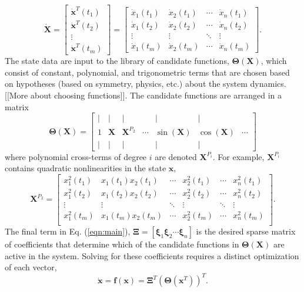 \documentclass[12pt,preprintnumbers,amsmath,amssymb,titlepage]{report}
\newcommand{\refe}[1]{Eq. (\ref{#1})}
\begin{document}
\begin{equation*}
	\bm{\dot{X}} = \begin{bmatrix} 
				\bm{\dot{x}}^T(t_1) \\ \bm{\dot{x}}^T(t_2) \\ \vdots \\ \bm{\dot{x}}^T(t_m)
			\end{bmatrix}
		   = \begin{bmatrix}
		   		\dot{x}_1(t_1) & \dot{x}_2(t_1) & \cdots & \dot{x}_n(t_1) \\
		   		\dot{x}_1(t_2) & \dot{x}_2(t_2) & \cdots & \dot{x}_n(t_2) \\
		   		\vdots    	   & \vdots   		& \ddots & \vdots  \\
		   		\dot{x}_1(t_m) & \dot{x}_2(t_m) & \cdots & \dot{x}_n(t_m)
	   		\end{bmatrix}.
\end{equation*}
The state data are input to the library of candidate functions, $\bm{\Theta}(\bm{X})$, which consist of constant, polynomial, and trigonometric terms that are chosen based on hypotheses (based on symmetry, physics, etc.) about the system dynamics. [[More about choosing functions]]. The candidate functions are arranged in a matrix 
\begin{equation}
	\bm{\Theta}(\bm{X}) = 
	\begin{bmatrix}
		\mid & \mid 	& \mid 	 		&        & \mid	  		& \mid 		   &  		\\
		1	 & \bm{X}   & \bm{X}^{P_2}  & \cdots & \sin(\bm{X}) & \cos(\bm{X}) & \cdots \\
		\mid & \mid 	& \mid 	 		&        & \mid	  		& \mid  	   &
	\end{bmatrix}
\end{equation}
where polynomial cross-terms of degree $i$ are denoted $\bm{X}^{P_i}$. For example, $\bm{X}^{P_i}$ contains quadratic nonlinearities in the state $\bm{x}$,
\begin{equation*}
	\bm{X}^{P_2} = 
		\begin{bmatrix}
			x_1^2(t_1)	&	x_1(t_1)x_2(t_1) & \cdots & x_2^2(t_1) & \cdots & x_n^2(t_1) \\
			x_1^2(t_2)	&	x_1(t_2)x_2(t_2) & \cdots & x_2^2(t_2) & \cdots & x_n^2(t_2) \\
			\vdots		&	\vdots		     & \ddots & \vdots	   & \ddots & \vdots	 \\
			x_1^2(t_m)	&	x_1(t_m)x_2(t_m) & \cdots & x_2^2(t_m) & \cdots & x_n^2(t_m) \\
		\end{bmatrix}.
\end{equation*}
The final term in \refe{eqn:main}, $\bm{\Xi} = [\bm{\xi}_1 \bm{\xi}_2 \cdots \bm{\xi}_n]$ is the desired sparse matrix of coefficients that determine which of the candidate functions in $\bm{\Theta}(\bm{X})$ are active in the system. Solving for these coefficients requires a distinct optimization of each vector, 
\begin{equation} \label{eqn:vector}
	\bm{\dot{x}} = \bm{f}(\bm{x}) = \bm{\Xi}^T(\bm{\Theta}(\bm{x}^T))^T.
\end{equation}
\end{document}
